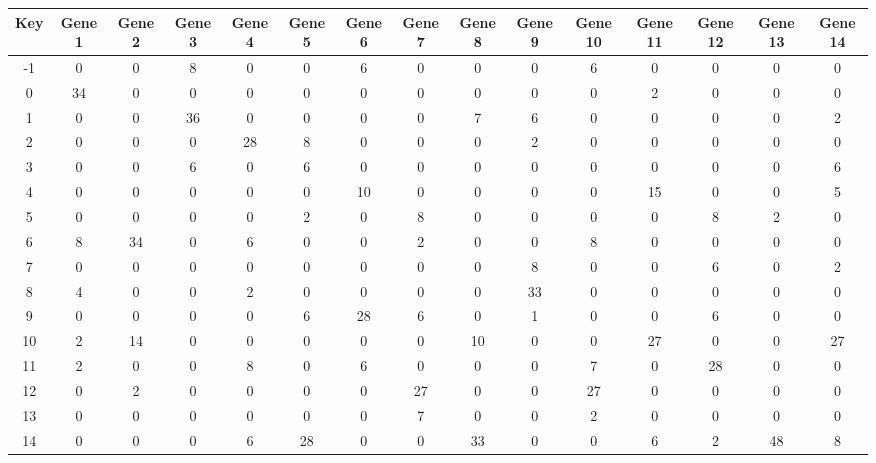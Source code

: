 \begin{tabular}{|c|c|c|c|c|c|c|c|c|c|c|c|c|c|c|}
\hline
Key & Gene 1 & Gene 2 & Gene 3 & Gene 4 & Gene 5 & Gene 6 & Gene 7 & Gene 8 & Gene 9 & Gene 10 & Gene 11 & Gene 12 & Gene 13 & Gene 14 \\
\hline
-1 & 0 & 0 & 8 & 0 & 0 & 6 & 0 & 0 & 0 & 6 & 0 & 0 & 0 & 0 \\
0 & 34 & 0 & 0 & 0 & 0 & 0 & 0 & 0 & 0 & 0 & 2 & 0 & 0 & 0 \\
1 & 0 & 0 & 36 & 0 & 0 & 0 & 0 & 7 & 6 & 0 & 0 & 0 & 0 & 2 \\
2 & 0 & 0 & 0 & 28 & 8 & 0 & 0 & 0 & 2 & 0 & 0 & 0 & 0 & 0 \\
3 & 0 & 0 & 6 & 0 & 6 & 0 & 0 & 0 & 0 & 0 & 0 & 0 & 0 & 6 \\
4 & 0 & 0 & 0 & 0 & 0 & 10 & 0 & 0 & 0 & 0 & 15 & 0 & 0 & 5 \\
5 & 0 & 0 & 0 & 0 & 2 & 0 & 8 & 0 & 0 & 0 & 0 & 8 & 2 & 0 \\
6 & 8 & 34 & 0 & 6 & 0 & 0 & 2 & 0 & 0 & 8 & 0 & 0 & 0 & 0 \\
7 & 0 & 0 & 0 & 0 & 0 & 0 & 0 & 0 & 8 & 0 & 0 & 6 & 0 & 2 \\
8 & 4 & 0 & 0 & 2 & 0 & 0 & 0 & 0 & 33 & 0 & 0 & 0 & 0 & 0 \\
9 & 0 & 0 & 0 & 0 & 6 & 28 & 6 & 0 & 1 & 0 & 0 & 6 & 0 & 0 \\
10 & 2 & 14 & 0 & 0 & 0 & 0 & 0 & 10 & 0 & 0 & 27 & 0 & 0 & 27 \\
11 & 2 & 0 & 0 & 8 & 0 & 6 & 0 & 0 & 0 & 7 & 0 & 28 & 0 & 0 \\
12 & 0 & 2 & 0 & 0 & 0 & 0 & 27 & 0 & 0 & 27 & 0 & 0 & 0 & 0 \\
13 & 0 & 0 & 0 & 0 & 0 & 0 & 7 & 0 & 0 & 2 & 0 & 0 & 0 & 0 \\
14 & 0 & 0 & 0 & 6 & 28 & 0 & 0 & 33 & 0 & 0 & 6 & 2 & 48 & 8 \\
\hline
\end{tabular}